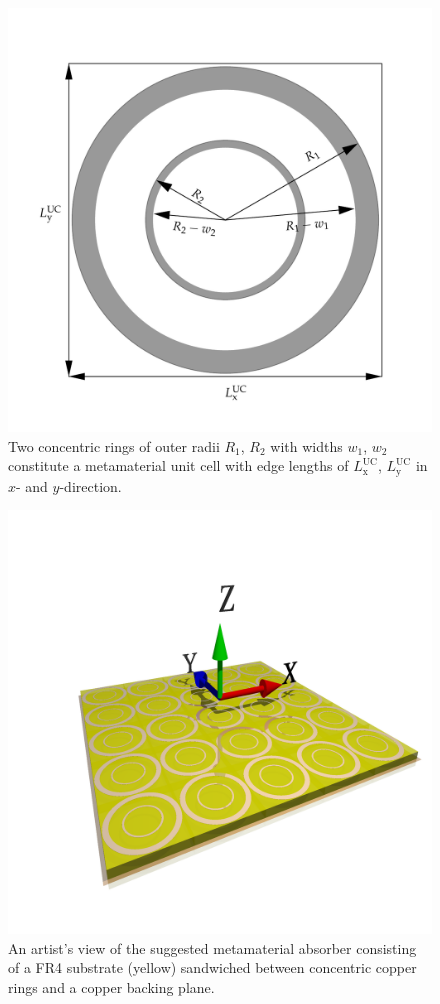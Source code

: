 \begin{figure}
\centering
\includegraphics[width=0.75\linewidth]{./media/double_ring_sketch.pdf}
\caption{Two concentric rings of outer radii $R_1$, $R_2$ with widths $w_1$, $w_2$ constitute a metamaterial unit cell with edge lengths of $L_\mathrm{x}^\mathrm{UC}$, $L_\mathrm{y}^\mathrm{UC}$ in $x$- and $y$-direction.}
\label{fig:double_ring_sketch}
\end{figure}

\begin{figure}
\centering
\includegraphics[width=0.75\linewidth]{./media/double_rings.png}
\caption{An artist's view of the suggested metamaterial absorber consisting of a FR4 substrate (yellow) sandwiched between concentric copper rings and a copper backing plane.}
\label{fig:artist_view}
\end{figure}

